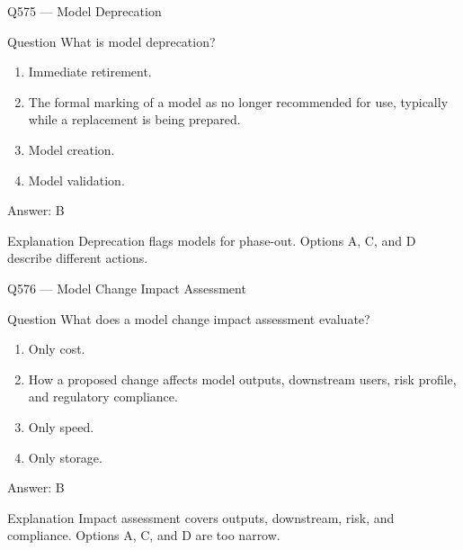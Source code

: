 \documentclass[aspectratio=169,8pt]{beamer}
\begin{document}
	\begin{frame}{Q575 --- Model Deprecation}
		\begin{block}{Question}
			What is model deprecation?
			\begin{enumerate}
				\item Immediate retirement.
				\item The formal marking of a model as no longer recommended for use, typically while a replacement is being prepared.
				\item Model creation.
				\item Model validation.
			\end{enumerate}
		\end{block}
		\begin{exampleblock}{Answer: B}\end{exampleblock}
		\begin{block}{Explanation}
			Deprecation flags models for phase-out. Options A, C, and D describe different actions.
		\end{block}
	\end{frame}
	
	\begin{frame}{Q576 --- Model Change Impact Assessment}
		\begin{block}{Question}
			What does a model change impact assessment evaluate?
			\begin{enumerate}
				\item Only cost.
				\item How a proposed change affects model outputs, downstream users, risk profile, and regulatory compliance.
				\item Only speed.
				\item Only storage.
			\end{enumerate}
		\end{block}
		\begin{exampleblock}{Answer: B}\end{exampleblock}
		\begin{block}{Explanation}
			Impact assessment covers outputs, downstream, risk, and compliance. Options A, C, and D are too narrow.
		\end{block}
	\end{frame}
	
\end{document}
